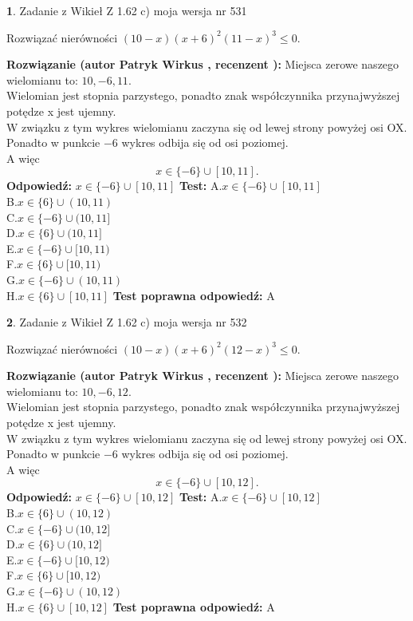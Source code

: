 \documentclass[12pt, a4paper]{article}
\theoremstyle{definition} %
\newtheorem{zad}{}
\newcommand{\zadStart}[1]{\begin{zad}#1\newline}
\newcommand{\zadStop}{\end{zad}}
\newcommand{\rozwStart}[2]{\noindent \textbf{Rozwiązanie (autor #1 , recenzent #2): }\newline}
\newcommand{\rozwStop}{\newline}
\newcommand{\odpStart}{\noindent \textbf{Odpowiedź:}\newline}
\newcommand{\odpStop}{\newline}
\newcommand{\testStart}{\noindent \textbf{Test:}\newline}
\newcommand{\testStop}{\newline}
\newcommand{\kluczStart}{\noindent \textbf{Test poprawna odpowiedź:}\newline}
\newcommand{\kluczStop}{\newline}
\begin{document}
\zadStart{Zadanie z Wikieł Z 1.62 c) moja wersja nr 531}

Rozwiązać nierówności $(10-x)(x+6)^{2}(11-x)^{3}\le0$.
\zadStop
\rozwStart{Patryk Wirkus}{}
Miejsca zerowe naszego wielomianu to: $10, -6, 11$.\\
Wielomian jest stopnia parzystego, ponadto znak współczynnika przy\linebreak najwyższej potędze x jest ujemny.\\ W związku z tym wykres wielomianu zaczyna się od lewej strony powyżej osi OX.\\
Ponadto w punkcie $-6$ wykres odbija się od osi poziomej.\\
A więc $$x \in \{-6\} \cup [10,11].$$
\rozwStop
\odpStart
$x \in \{-6\} \cup [10,11]$
\odpStop
\testStart
A.$x \in \{-6\} \cup [10,11]$\\
B.$x \in \{6\} \cup (10,11)$\\
C.$x \in \{-6\} \cup (10,11]$\\
D.$x \in \{6\} \cup (10,11]$\\
E.$x \in \{-6\} \cup [10,11)$\\
F.$x \in \{6\} \cup [10,11)$\\
G.$x \in \{-6\} \cup (10,11)$\\
H.$x \in \{6\} \cup [10,11]$
\testStop
\kluczStart
A
\kluczStop



\zadStart{Zadanie z Wikieł Z 1.62 c) moja wersja nr 532}

Rozwiązać nierówności $(10-x)(x+6)^{2}(12-x)^{3}\le0$.
\zadStop
\rozwStart{Patryk Wirkus}{}
Miejsca zerowe naszego wielomianu to: $10, -6, 12$.\\
Wielomian jest stopnia parzystego, ponadto znak współczynnika przy\linebreak najwyższej potędze x jest ujemny.\\ W związku z tym wykres wielomianu zaczyna się od lewej strony powyżej osi OX.\\
Ponadto w punkcie $-6$ wykres odbija się od osi poziomej.\\
A więc $$x \in \{-6\} \cup [10,12].$$
\rozwStop
\odpStart
$x \in \{-6\} \cup [10,12]$
\odpStop
\testStart
A.$x \in \{-6\} \cup [10,12]$\\
B.$x \in \{6\} \cup (10,12)$\\
C.$x \in \{-6\} \cup (10,12]$\\
D.$x \in \{6\} \cup (10,12]$\\
E.$x \in \{-6\} \cup [10,12)$\\
F.$x \in \{6\} \cup [10,12)$\\
G.$x \in \{-6\} \cup (10,12)$\\
H.$x \in \{6\} \cup [10,12]$
\testStop
\kluczStart
A
\kluczStop
\end{document}
